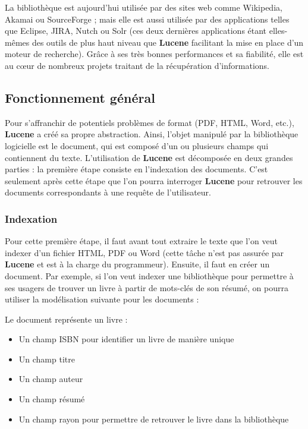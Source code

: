 La bibliothèque est aujourd’hui utilisée par des sites web comme Wikipedia, Akamai ou SourceForge ; mais elle est aussi utilisée par des applications telles que Eclipse, JIRA, Nutch ou Solr (ces deux dernières applications étant elles-mêmes des outils de plus haut niveau que \textbf{Lucene} facilitant la mise en place d’un moteur de recherche). Grâce à ses très bonnes performances et sa fiabilité, elle est au cœur de nombreux projets traitant de la récupération d’informations.

\subsection{Fonctionnement général}
\label{section:fonctionnementGeneral}

Pour s’affranchir de potentiels problèmes de format (PDF, HTML, Word, etc.), \textbf{Lucene} a créé sa propre abstraction. Ainsi, l’objet manipulé par la bibliothèque logicielle est le document, qui est composé d’un ou plusieurs champs qui contiennent du texte.
L’utilisation de \textbf{Lucene} est décomposée en deux grandes parties : la première étape consiste en l’indexation des documents. C’est seulement après cette étape que l’on pourra interroger \textbf{Lucene} pour retrouver les documents correspondants à une requête de l’utilisateur.

\subsubsection{Indexation}
\label{section:indexation}

Pour cette première étape, il faut avant tout extraire le texte que l’on veut indexer d’un fichier HTML, PDF ou Word (cette tâche n’est pas assurée par \textbf{Lucene} et est à la charge du programmeur). Ensuite, il faut en créer un document. Par exemple, si l’on veut indexer une bibliothèque pour permettre à ses usagers de trouver un livre à partir de mots-clés de son résumé, on pourra utiliser la modélisation suivante pour les documents :

Le document représente un livre :
\begin{itemize}
  \item Un champ ISBN pour identifier un livre de manière unique
  \item Un champ titre
  \item Un champ auteur
  \item Un champ résumé
  \item Un champ rayon pour permettre de retrouver le livre dans la bibliothèque
\end{itemize}

